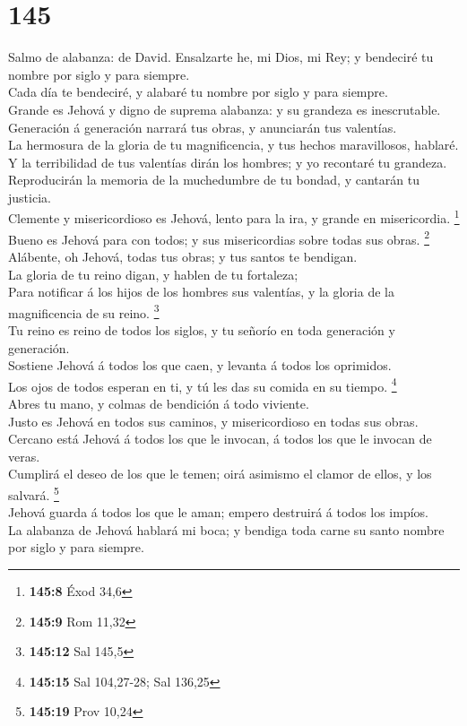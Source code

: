 \hypertarget{section-144}{%
\section{145}\label{section-144}}

 Salmo de alabanza: de David. Ensalzarte he, mi Dios, mi
Rey; y bendeciré tu nombre por siglo y para siempre.\\
 Cada día te bendeciré, y alabaré tu nombre por siglo y para
siempre.\\
 Grande es Jehová y digno de suprema alabanza: y su grandeza
es inescrutable.\\
 Generación á generación narrará tus obras, y anunciarán tus
valentías.\\
 La hermosura de la gloria de tu magnificencia, y tus hechos
maravillosos, hablaré.\\
 Y la terribilidad de tus valentías dirán los hombres; y yo
recontaré tu grandeza.\\
 Reproducirán la memoria de la muchedumbre de tu bondad, y
cantarán tu justicia.\\
 Clemente y misericordioso es Jehová, lento para la ira, y
grande en misericordia. \footnote{\textbf{145:8} Éxod 34,6}\\
 Bueno es Jehová para con todos; y sus misericordias sobre
todas sus obras. \footnote{\textbf{145:9} Rom 11,32}\\
 Alábente, oh Jehová, todas tus obras; y tus santos te
bendigan.\\
 La gloria de tu reino digan, y hablen de tu fortaleza;\\
 Para notificar á los hijos de los hombres sus valentías, y
la gloria de la magnificencia de su reino. \footnote{\textbf{145:12} Sal
  145,5}\\
 Tu reino es reino de todos los siglos, y tu señorío en
toda generación y generación.\\
 Sostiene Jehová á todos los que caen, y levanta á todos
los oprimidos.\\
 Los ojos de todos esperan en ti, y tú les das su comida en
su tiempo. \footnote{\textbf{145:15} Sal 104,27-28; Sal 136,25}\\
 Abres tu mano, y colmas de bendición á todo viviente.\\
 Justo es Jehová en todos sus caminos, y misericordioso en
todas sus obras.\\
 Cercano está Jehová á todos los que le invocan, á todos
los que le invocan de veras.\\
 Cumplirá el deseo de los que le temen; oirá asimismo el
clamor de ellos, y los salvará. \footnote{\textbf{145:19} Prov 10,24}\\
 Jehová guarda á todos los que le aman; empero destruirá á
todos los impíos.\\
 La alabanza de Jehová hablará mi boca; y bendiga toda
carne su santo nombre por siglo y para siempre.

